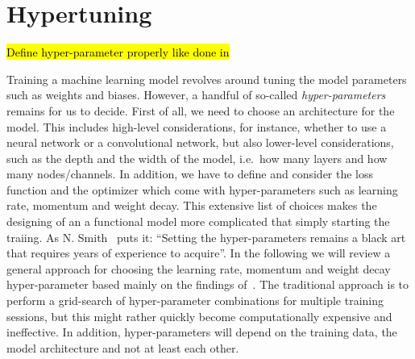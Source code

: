 \section{Hypertuning}\label{sec:hypertuning}
\hl{Define hyper-parameter properly like done in}~\cite{Bengio2012}

Training a machine learning model revolves around tuning the model parameters such as weights and biases. However, a handful of so-called \textit{hyper-parameters} remains for us to decide. First of all, we need to choose an architecture for the model. This includes high-level considerations, for instance, whether to use a neural network or a convolutional network, but also lower-level considerations, such as the depth and the width of the model, i.e.\ how many layers and how many nodes/channels. In addition, we have to define and consider the loss function and the optimizer which come with hyper-parameters such as learning rate, momentum and weight decay. This extensive list of choices makes the designing of an a functional model more complicated that simply starting the traiing. As N. Smith~\cite{smith2018disciplined} puts it: ``Setting the
hyper-parameters remains a black art that requires years of experience to
acquire''. In the following we will review a general approach for choosing the learning rate, momentum and weight decay hyper-parameter based mainly on the findings of~\cite{smith2018disciplined}. The traditional approach is to
perform a grid-search of hyper-parameter combinations for multiple training sessions, but this might rather quickly become computationally expensive and ineffective. In addition, hyper-parameters will depend on the training data, the model architecture and not at least each other. 



